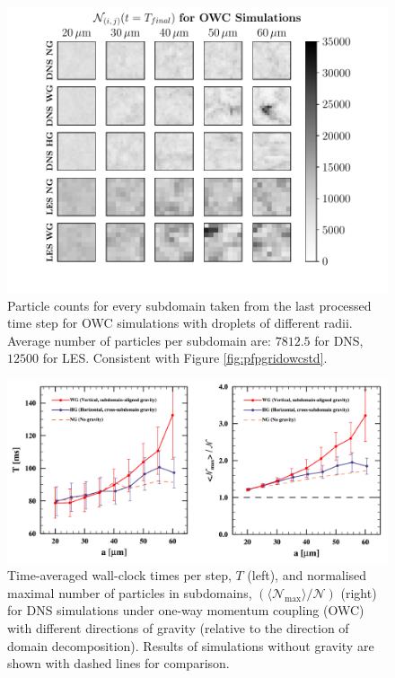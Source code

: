 
\begin{figure}
\centering
\includegraphics[width=13.5cm]{figures/3-20_pfpgridowclast.pdf}
\caption{
Particle counts for every subdomain taken from the last processed time step for OWC simulations with droplets of different radii.
Average number of particles per subdomain are: $7 812.5$ for DNS, $12 500$ for LES.
Consistent with Figure \ref{fig:pfpgridowcstd}.
}
\label{fig:pfpgridowclast}
\end{figure}


\begin{figure}
\centering
\includegraphics[width=13.5cm]{figures/3-21_howcperf.pdf}
\caption{
Time-averaged wall-clock times per step, $T$ (left), and normalised maximal number of particles in subdomains, $(\langle \mathcal{N}_{\max} \rangle / \mathcal{N})$ (right) for DNS simulations under one-way momentum coupling (OWC) with different directions of gravity (relative to the direction of domain decomposition).
Results of simulations without gravity are shown with dashed lines for comparison. 
}
\label{fig:howcperf}
\end{figure}
    
